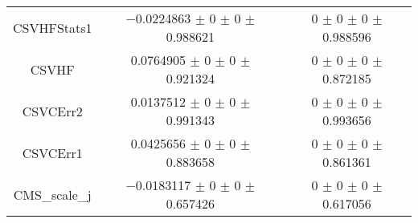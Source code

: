 \begin{table}
\begin{tabular}{ccc}
CSVHFStats1 	& \num{-0.0224863} $\pm$ \num{0} $\pm$ \num{0} $\pm$ \num{0.988621} 	& \num{0} $\pm$ \num{0} $\pm$ \num{0} $\pm$ \num{0.988596}\\
CSVHF 	& \num{0.0764905} $\pm$ \num{0} $\pm$ \num{0} $\pm$ \num{0.921324} 	& \num{0} $\pm$ \num{0} $\pm$ \num{0} $\pm$ \num{0.872185}\\
CSVCErr2 	& \num{0.0137512} $\pm$ \num{0} $\pm$ \num{0} $\pm$ \num{0.991343} 	& \num{0} $\pm$ \num{0} $\pm$ \num{0} $\pm$ \num{0.993656}\\
CSVCErr1 	& \num{0.0425656} $\pm$ \num{0} $\pm$ \num{0} $\pm$ \num{0.883658} 	& \num{0} $\pm$ \num{0} $\pm$ \num{0} $\pm$ \num{0.861361}\\
CMS\_scale\_j 	& \num{-0.0183117} $\pm$ \num{0} $\pm$ \num{0} $\pm$ \num{0.657426} 	& \num{0} $\pm$ \num{0} $\pm$ \num{0} $\pm$ \num{0.617056}\\
\bottomrule
\end{tabular}
\end{table}
